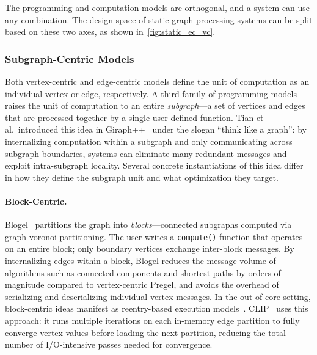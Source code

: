 The programming and computation models are orthogonal, and a system can use any combination.
The design space of static graph processing systems can be split based on these two axes, as shown in~\autoref{fig:static_ec_vc}.
\begin{table}[t]
    \centering
    \small
    \caption{Design space of static graph processing systems classified by programming model (columns) and computation model (rows). Hybrid systems are noted below the table.}
    \label{fig:static_ec_vc}
    
\end{table}

\subsubsection{Subgraph-Centric Models}
\label{design:subgraph_centric}

Both vertex-centric and edge-centric models define the unit of computation as an individual vertex or edge, respectively.
A third family of programming models raises the unit of computation to an entire \emph{subgraph}---a set of vertices and edges that are processed together by a single user-defined function.
Tian et al.\ introduced this idea in Giraph++~\cite{tian2013giraphpp} under the slogan ``think like a graph'': by internalizing computation within a subgraph and only communicating across subgraph boundaries, systems can eliminate many redundant messages and exploit intra-subgraph locality.
Several concrete instantiations of this idea differ in how they define the subgraph unit and what optimization they target.

\paragraph{Block-Centric.}
Blogel~\cite{yan2014blogel} partitions the graph into \emph{blocks}---connected subgraphs computed via graph voronoi partitioning.
The user writes a \texttt{compute()} function that operates on an entire block; only boundary vertices exchange inter-block messages.
By internalizing edges within a block, Blogel reduces the message volume of algorithms such as connected components and shortest paths by orders of magnitude compared to vertex-centric Pregel, and avoids the overhead of serializing and deserializing individual vertex messages.
In the out-of-core setting, block-centric ideas manifest as reentry-based execution models~\cite[Section~4.2.2]{xu2026oocsurvey}.
CLIP~\cite{ai2018clip} uses this approach: it runs multiple iterations on each in-memory edge partition to fully converge vertex values before loading the next partition, reducing the total number of I/O-intensive passes needed for convergence.

